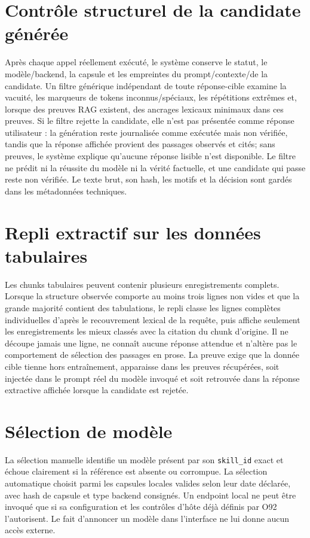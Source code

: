 \documentclass[11pt,a4paper]{article}
\begin{document}
\section{Contrôle structurel de la candidate générée}
Après chaque appel réellement exécuté, le système conserve le statut, le modèle/backend, la capsule et les empreintes du prompt/contexte/de la candidate. Un filtre générique indépendant de toute réponse-cible examine la vacuité, les marqueurs de tokens inconnus/spéciaux, les répétitions extrêmes et, lorsque des preuves RAG existent, des ancrages lexicaux minimaux dans ces preuves. Si le filtre rejette la candidate, elle n’est pas présentée comme réponse utilisateur : la génération reste journalisée comme exécutée mais non vérifiée, tandis que la réponse affichée provient des passages observés et cités; sans preuves, le système explique qu’aucune réponse lisible n’est disponible. Le filtre ne prédit ni la réussite du modèle ni la vérité factuelle, et une candidate qui passe reste non vérifiée. Le texte brut, son hash, les motifs et la décision sont gardés dans les métadonnées techniques.
\section{Repli extractif sur les données tabulaires}
Les chunks tabulaires peuvent contenir plusieurs enregistrements complets. Lorsque la structure observée comporte au moins trois lignes non vides et que la grande majorité contient des tabulations, le repli classe les lignes complètes individuelles d'après le recouvrement lexical de la requête, puis affiche seulement les enregistrements les mieux classés avec la citation du chunk d'origine. Il ne découpe jamais une ligne, ne connaît aucune réponse attendue et n'altère pas le comportement de sélection des passages en prose. La preuve exige que la donnée cible tienne hors entraînement, apparaisse dans les preuves récupérées, soit injectée dans le prompt réel du modèle invoqué et soit retrouvée dans la réponse extractive affichée lorsque la candidate est rejetée.
\section{Sélection de modèle}
La sélection manuelle identifie un modèle présent par son \texttt{skill\_id} exact et échoue clairement si la référence est absente ou corrompue. La sélection automatique choisit parmi les capsules locales valides selon leur date déclarée, avec hash de capsule et type backend consignés. Un endpoint local ne peut être invoqué que si sa configuration et les contrôles d'hôte déjà définis par O92 l'autorisent. Le fait d'annoncer un modèle dans l'interface ne lui donne aucun accès externe.
\end{document}
